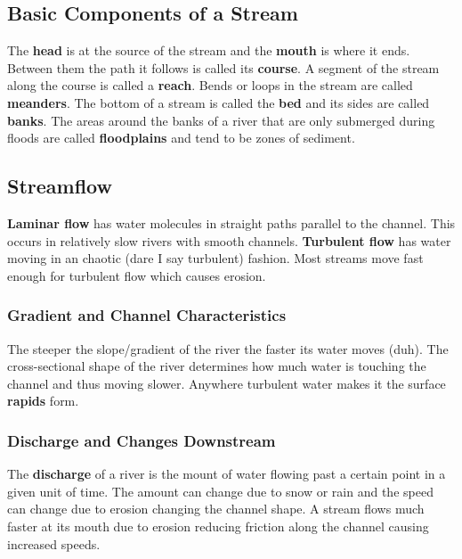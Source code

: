 \documentclass{article}
\begin{document}

\subsection{Basic Components of a Stream} %
\label{sub:basic_components_of_a_stream}
The \textbf{head} is at the source of the stream and the \textbf{mouth} is where it ends. Between them the path it follows is called its \textbf{course}. A segment of the stream along the course is called a \textbf{reach}. Bends or loops in the stream are called \textbf{meanders}. The bottom of a stream is called the \textbf{bed} and its sides are called \textbf{banks}. The areas around the banks of a river that are only submerged during floods are called \textbf{floodplains} and tend to be zones of sediment.

\subsection{Streamflow} %
\label{sub:streamflow}
\textbf{Laminar flow} has water molecules in straight paths parallel to the channel. This occurs in relatively slow rivers with smooth channels. \textbf{Turbulent flow} has water moving in an chaotic (dare I say turbulent) fashion. Most streams move fast enough for turbulent flow which causes erosion.

\subsubsection{Gradient and Channel Characteristics} %
\label{ssub:gradient_and_channel_characteristics}
The steeper the slope/gradient of the river the faster its water moves (duh). The cross-sectional shape of the river determines how much water is touching the channel and thus moving slower. Anywhere turbulent water makes it the surface \textbf{rapids} form.

\subsubsection{Discharge and Changes Downstream} %
\label{ssub:discharge_and_changes_downstream}
The \textbf{discharge} of a river is the mount of water flowing past a certain point in a given unit of time. The amount can change due to snow or rain and the speed can change due to erosion changing the channel shape. A stream flows much faster at its mouth due to erosion reducing friction along the channel causing increased speeds.
\end{document}
